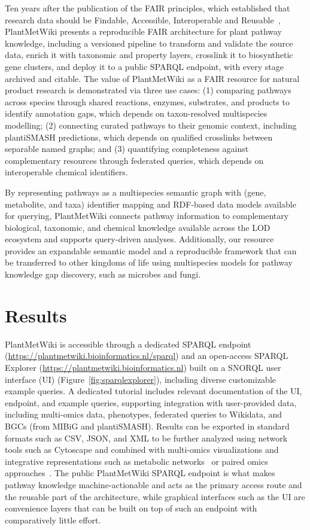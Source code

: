 \documentclass[11pt,a4paper]{article}
\begin{document}
Ten years after the publication of the FAIR principles, which established that research data
should be Findable, Accessible, Interoperable and Reusable~\cite{wilkinson2016}, PlantMetWiki presents
a reproducible FAIR architecture for plant pathway knowledge, including a versioned pipeline to transform and
validate the source data, enrich it with taxonomic and property layers, crosslink it to biosynthetic gene clusters, and deploy it to a
public SPARQL endpoint, with every stage archived and citable.
The value of PlantMetWiki as a FAIR resource for natural product research is demonstrated via three use cases: (1) comparing pathways across species through shared reactions, enzymes, substrates,
and products to identify annotation gaps, which depends on taxon-resolved multispecies modelling;
(2) connecting curated pathways to their genomic context, including plantiSMASH predictions, which
depends on qualified crosslinks between separable named graphs; and (3) quantifying completeness
against complementary resources through federated queries, which depends on interoperable chemical
identifiers.

By
representing pathways as a multispecies semantic graph with (gene, metabolite, and taxa) identifier
mapping and RDF-based data models available for querying, PlantMetWiki connects pathway information
to complementary biological, taxonomic, and chemical knowledge available across the LOD ecosystem and
supports query-driven analyses. Additionally, our resource provides an expandable semantic model and
a reproducible framework that can be transferred to other kingdoms of life using multispecies models
for pathway knowledge gap discovery, such as microbes and fungi.

\section*{Results}

PlantMetWiki is accessible through a dedicated SPARQL endpoint
(\url{https://plantmetwiki.bioinformatics.nl/sparql}) and an open-access SPARQL Explorer
(\url{https://plantmetwiki.bioinformatics.nl}) built on a SNORQL user interface (UI)
(Figure~\ref{fig:sparqlexplorer}), including
diverse customizable example
queries. A dedicated tutorial includes relevant documentation of the UI, endpoint, and example
queries, supporting integration with user-provided data, including multi-omics data, phenotypes,
federated queries to Wikidata, and BGCs (from MIBiG and plantiSMASH). Results can be exported in
standard formats such as CSV, JSON, and XML to be further analyzed using network tools such as
Cytoscape and combined with multi-omics visualizations and integrative representations such as
metabolic networks~\cite{mildau2025} or paired omics approaches~\cite{wolters2024}. The public PlantMetWiki SPARQL endpoint is what makes pathway knowledge machine-actionable and acts as the primary access route and the reusable part of the architecture, while graphical interfaces such as the UI are convenience layers that can be built on top of such an endpoint with
comparatively little effort.
\end{document}
